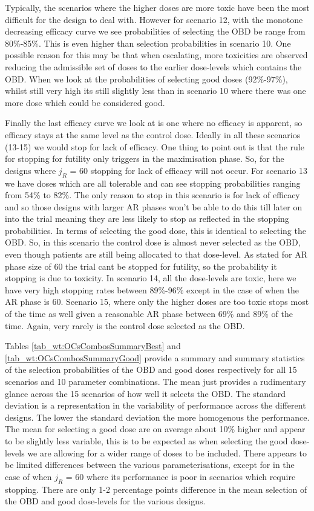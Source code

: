 Typically, the scenarios where the higher doses are more toxic have been the most difficult for the design to deal with. However for scenario 12, with the monotone decreasing efficacy curve we see probabilities of selecting the OBD be range from 80\%-85\%. This is even higher than selection probabilities in scenario 10. One possible reason for this may be that when escalating, more toxicities are observed reducing the admissible set of doses to the earlier dose-levels which contains the OBD. When we look at the probabilities of selecting good doses (92\%-97\%), whilst still very high its still slightly less than in scenario 10 where there was one more dose which could be considered good. 

Finally the last efficacy curve we look at is one where no efficacy is apparent, so efficacy stays at the same level as the control dose. Ideally in all these scenarios (13-15) we would stop for lack of efficacy. One thing to point out is that the rule for stopping for futility only triggers in the maximisation phase. So, for the designs where $j_R$ = 60 stopping for lack of efficacy will not occur. For scenario 13 we have doses which are all tolerable and can see stopping probabilities ranging from 54\% to 82\%. The only reason to stop in this scenario is for lack of efficacy and so those designs with larger AR phases won't be able to do this till later on into the trial meaning they are less likely to stop as reflected in the stopping probabilities. In terms of selecting the good dose, this is identical to selecting the OBD. So, in this scenario the control dose is almost never selected as the OBD, even though patients are still being allocated to that dose-level. As stated for AR phase size of 60 the trial cant be stopped for futility, so the probability it stopping is due to toxicity. In scenario 14, all the dose-levels are toxic, here we have very high stopping rates between 89\%-96\% except in the case of when the AR phase is 60. Scenario 15, where only the higher doses are too toxic stops most of the time as well given a reasonable AR phase between 69\% and 89\% of the time. Again, very rarely is the control dose selected as the OBD. 

Tables \ref{tab_wt:OCsCombosSummaryBest} and \ref{tab_wt:OCsCombosSummaryGood} provide a summary and summary statistics of the selection probabilities of the OBD and good doses respectively for all 15 scenarios and 10 parameter combinations. The mean just provides a rudimentary glance across the 15 scenarios of how well it selects the OBD. The standard deviation is a representation in the variability of performance across the different designs. The lower the standard deviation the more homogenous the performance. The mean for selecting a good dose are on average about 10\% higher and appear to be slightly less variable, this is to be expected as when selecting the good dose-levels we are allowing for a wider range of doses to be included. There appears to be limited differences between the various parameterisations, except for in the case of when $j_R$ = 60 where its performance is poor in scenarios which require stopping. There are only 1-2 percentage points difference in the mean selection of the OBD and good dose-levels for the various designs. 


